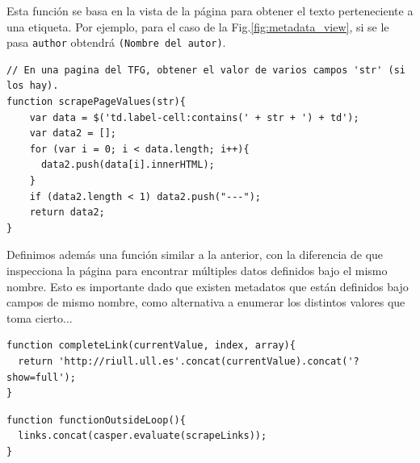 Esta función se basa en la vista de la página para obtener el texto perteneciente a una etiqueta. Por ejemplo, para el caso de la Fig.\ref{fig:metadata_view}, si se le pasa \texttt{author} obtendrá \texttt{(Nombre del autor)}.


\begin{center}
\begin{minipage}{\linewidth}
\begin{lstlisting}[caption=Función de obtención de metadatos por nombre de etiqueta similar.]
// En una pagina del TFG, obtener el valor de varios campos 'str' (si los hay).
function scrapePageValues(str){
    var data = $('td.label-cell:contains(' + str + ') + td');
    var data2 = [];
    for (var i = 0; i < data.length; i++){
      data2.push(data[i].innerHTML);
    }
    if (data2.length < 1) data2.push("---");
    return data2;
}
\end{lstlisting}
\end{minipage}
\end{center}

Definimos además una función similar a la anterior, con la diferencia de que inspecciona la página para encontrar múltiples datos definidos bajo el mismo nombre. Esto es importante dado que existen metadatos que están definidos bajo campos de mismo nombre, como alternativa a enumerar los distintos valores que toma cierto...

\begin{center}
\begin{minipage}{\linewidth}
\begin{lstlisting}[caption=Función de concatenación de enlace.]
function completeLink(currentValue, index, array){
  return 'http://riull.ull.es'.concat(currentValue).concat('?show=full');
}
\end{lstlisting}
\end{minipage}
\end{center}


\begin{center}
\begin{minipage}{\linewidth}
\begin{lstlisting}[caption=Función tipo que permite la recurrencia con CasperJS.]
function functionOutsideLoop(){
  links.concat(casper.evaluate(scrapeLinks));
}
\end{lstlisting}
\end{minipage}
\end{center}
